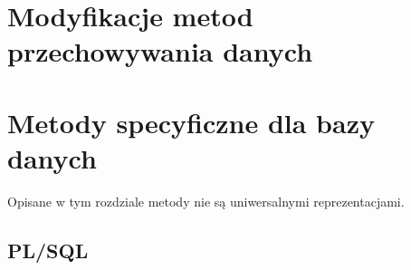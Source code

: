 \documentclass[11pt,a4paper,oneside]{report}
\begin{document}
    
    \clearpage



\chapter{Modyfikacje metod przechowywania danych}


\chapter{Metody specyficzne dla bazy danych}
    Opisane w tym rozdziale metody nie są uniwersalnymi reprezentacjami.

    
    \clearpage
	\section{PL/SQL}
	\clearpage

	
	\clearpage

	
	\clearpage

	
	\clearpage
	
	
	\clearpage



\end{document}
